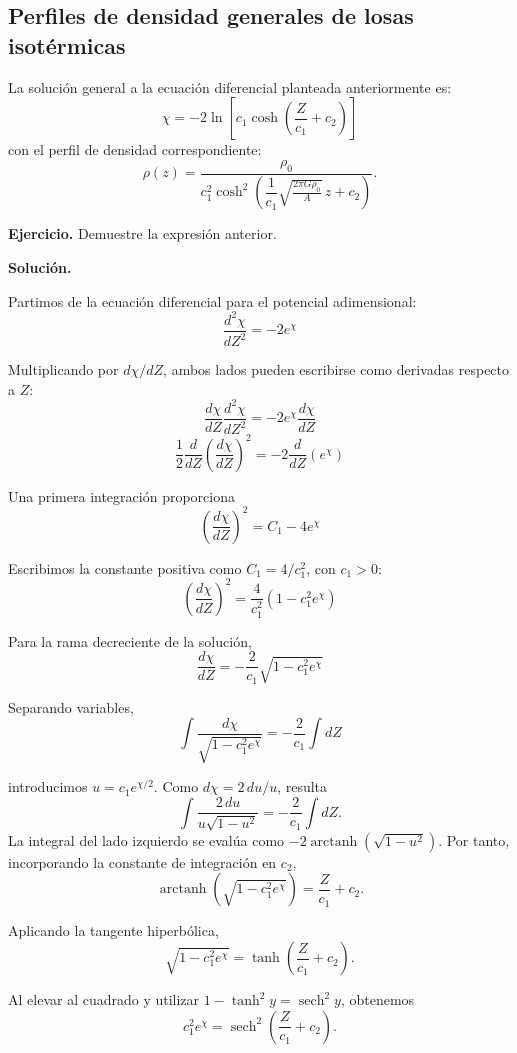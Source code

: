 \figuraPerfilLosaIsotermica

\subsection{Perfiles de densidad generales de losas isotérmicas}

La solución general a la ecuación diferencial planteada anteriormente es:
$$ \chi = -2 \ln\left[c_1 \cosh\left(\frac{Z}{c_1} + c_2\right)\right] $$
con el perfil de densidad correspondiente:
$$
\rho(z)
=\frac{\rho_0}{c_1^2
\cosh^2\left(
\dfrac{1}{c_1}\sqrt{\frac{2\pi G\rho_0}{A}}\,z+c_2
\right)}.
$$

\textbf{Ejercicio.} Demuestre la expresión anterior.

\textbf{Solución.}

Partimos de la ecuación diferencial para el potencial adimensional:
$$ \frac{d^2\chi}{dZ^2} = -2e^\chi $$

Multiplicando por $d\chi/dZ$, ambos lados pueden escribirse como derivadas respecto a $Z$:
$$ \frac{d\chi}{dZ} \frac{d^2\chi}{dZ^2} = -2e^\chi \frac{d\chi}{dZ} $$
$$ \frac{1}{2} \frac{d}{dZ} \left( \frac{d\chi}{dZ} \right)^2 = -2 \frac{d}{dZ} (e^\chi) $$

Una primera integración proporciona
$$ \left( \frac{d\chi}{dZ} \right)^2 = C_1 - 4e^\chi $$

Escribimos la constante positiva como $C_1=4/c_1^2$, con $c_1>0$:
$$ \left( \frac{d\chi}{dZ} \right)^2 = \frac{4}{c_1^2} \left( 1 - c_1^2 e^\chi \right) $$

Para la rama decreciente de la solución,
$$ \frac{d\chi}{dZ} = -\frac{2}{c_1} \sqrt{1 - c_1^2 e^\chi} $$

Separando variables,
$$ \int \frac{d\chi}{\sqrt{1 - c_1^2 e^\chi}} = -\frac{2}{c_1} \int dZ $$

introducimos $u=c_1e^{\chi/2}$. Como $d\chi=2\,du/u$, resulta
$$
\int\frac{2\,du}{u\sqrt{1-u^2}}
=-\frac{2}{c_1}\int dZ.
$$
La integral del lado izquierdo se evalúa como
$-2\operatorname{arctanh}(\sqrt{1-u^2})$. Por tanto, incorporando la constante de integración en $c_2$,
$$
\operatorname{arctanh}\left(\sqrt{1-c_1^2e^\chi}\right)
=\frac{Z}{c_1}+c_2.
$$

Aplicando la tangente hiperbólica,
$$
\sqrt{1-c_1^2e^\chi}
=\tanh\left(\frac{Z}{c_1}+c_2\right).
$$

Al elevar al cuadrado y utilizar $1-\tanh^2 y=\operatorname{sech}^2y$, obtenemos
$$
c_1^2e^\chi
=\operatorname{sech}^2\left(\frac{Z}{c_1}+c_2\right).
$$

